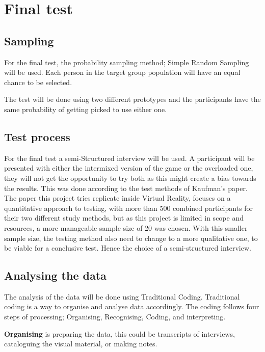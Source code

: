     
    \section{Final test}\label{methods:ft}
     \subsection{Sampling}
     For the final test, the probability sampling method; Simple Random Sampling will be used\cite{bjoernerBog}. Each person in the target group population will have an equal chance to be selected.
     
     The test will be done using two different prototypes and the participants have the same probability of getting picked to use either one. 
    
    \subsection{Test process}
    For the final test a semi-Structured interview will be used\cite{bjoernerBog}. A participant will be presented with either the intermixed version of the game or the overloaded one, they will not get the opportunity to try both as this might create a bias towards the results\cite{bjoernerBog}. This was done according to the test methods of Kaufman's paper\cite{embeddedDesignModel, embeddedDesignModelTestDetails}. The paper this project tries replicate inside Virtual Reality, focuses on a quantitative approach to testing, with more than 500 combined participants for their two different study methods, but as this project is limited in scope and resources, a more manageable sample size of 20 was chosen. With this smaller sample size, the testing method also need to change to a more qualitative one, to be viable for a conclusive test. Hence the choice of a semi-structured interview.
    
    \subsection{Analysing the data}
    The analysis of the data will be done using Traditional Coding\cite{bjoernerBog}. Traditional coding is a way to organise and analyse data accordingly. The coding follows four steps of processing; Organising, Recognising, Coding, and interpreting\cite{bjoernerBog}. 
    
    \textbf{Organising} is preparing the data, this could be transcripts of interviews, cataloguing the visual material, or making notes\cite{bjoernerBog}.
    
